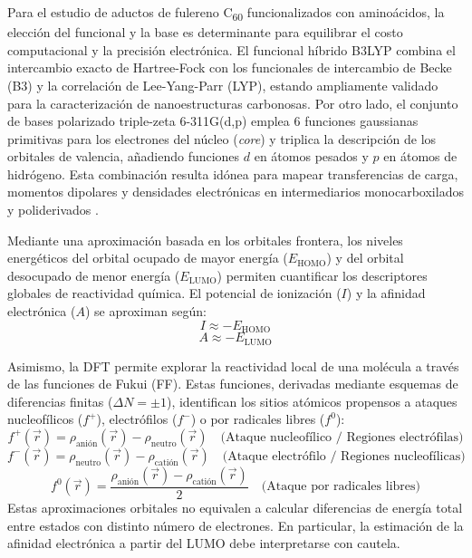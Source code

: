 Para el estudio de aductos de fulereno C\textsubscript{60} funcionalizados con aminoácidos, la elección del funcional y la base es determinante para equilibrar el costo computacional y la precisión electrónica. El funcional híbrido B3LYP combina el intercambio exacto de Hartree-Fock con los funcionales de intercambio de Becke (B3) y la correlación de Lee-Yang-Parr (LYP), estando ampliamente validado para la caracterización de nanoestructuras carbonosas. Por otro lado, el conjunto de bases polarizado triple-zeta 6-311G(d,p) emplea 6 funciones gaussianas primitivas para los electrones del núcleo (\textit{core}) y triplica la descripción de los orbitales de valencia, añadiendo funciones $d$ en átomos pesados y $p$ en átomos de hidrógeno. Esta combinación resulta idónea para mapear transferencias de carga, momentos dipolares y densidades electrónicas en intermediarios monocarboxilados y poliderivados \cite{nikolaev2020thermodynamic, mico2024estudio}.

 Mediante una aproximación basada en los orbitales frontera, los niveles energéticos del orbital ocupado de mayor energía ($E_{\text{HOMO}}$) y del orbital desocupado de menor energía ($E_{\text{LUMO}}$) permiten cuantificar los descriptores globales de reactividad química. El potencial de ionización ($I$) y la afinidad electrónica ($A$) se aproximan según:
\begin{equation}
I \approx -E_{\text{HOMO}}
\end{equation}
\begin{equation}
A \approx -E_{\text{LUMO}}
\end{equation}

Asimismo, la DFT permite explorar la reactividad local de una molécula a través de las funciones de Fukui (FF). Estas funciones, derivadas mediante esquemas de diferencias finitas ($\Delta N = \pm 1$), identifican los sitios atómicos propensos a ataques nucleofílicos ($f^+$), electrófilos ($f^-$) o por radicales libres ($f^0$):
\begin{equation}
f^+(\vec{r}) = \rho_{\text{anión}}(\vec{r}) - \rho_{\text{neutro}}(\vec{r}) \quad \text{(Ataque nucleofílico / Regiones electrófilas)}
\end{equation}
\begin{equation}
f^-(\vec{r}) = \rho_{\text{neutro}}(\vec{r}) - \rho_{\text{catión}}(\vec{r}) \quad \text{(Ataque electrófilo / Regiones nucleofílicas)}
\end{equation}
\begin{equation}
f^0(\vec{r}) = \frac{\rho_{\text{anión}}(\vec{r}) - \rho_{\text{catión}}(\vec{r})}{2} \quad \text{(Ataque por radicales libres)}
\end{equation}
Estas aproximaciones orbitales no equivalen a calcular diferencias de energía total entre estados con distinto número de electrones. En particular, la estimación de la afinidad electrónica a partir del LUMO debe interpretarse con cautela.


